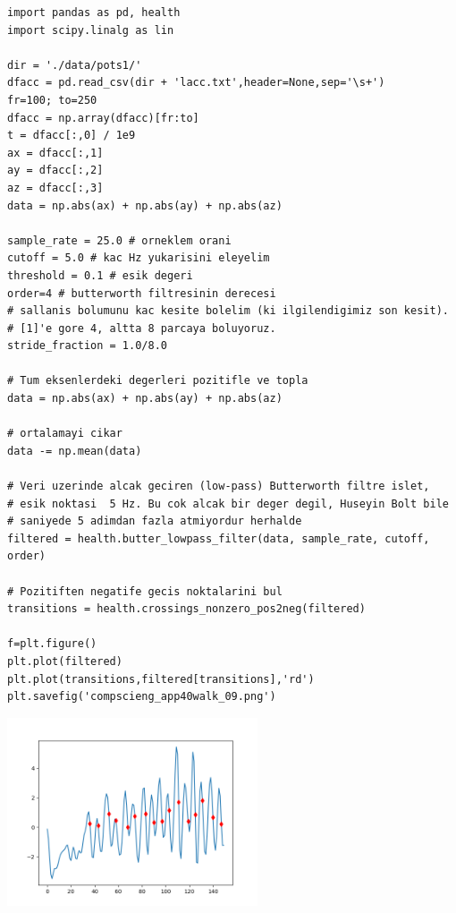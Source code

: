 \documentclass[12pt,fleqn]{article}\usepackage{../../common}
\begin{document}
\begin{verbatim}
import pandas as pd, health
import scipy.linalg as lin

dir = './data/pots1/'
dfacc = pd.read_csv(dir + 'lacc.txt',header=None,sep='\s+')
fr=100; to=250
dfacc = np.array(dfacc)[fr:to]
t = dfacc[:,0] / 1e9
ax = dfacc[:,1]
ay = dfacc[:,2]
az = dfacc[:,3]
data = np.abs(ax) + np.abs(ay) + np.abs(az)

sample_rate = 25.0 # orneklem orani
cutoff = 5.0 # kac Hz yukarisini eleyelim
threshold = 0.1 # esik degeri
order=4 # butterworth filtresinin derecesi
# sallanis bolumunu kac kesite bolelim (ki ilgilendigimiz son kesit). 
# [1]'e gore 4, altta 8 parcaya boluyoruz.
stride_fraction = 1.0/8.0 

# Tum eksenlerdeki degerleri pozitifle ve topla
data = np.abs(ax) + np.abs(ay) + np.abs(az)

# ortalamayi cikar
data -= np.mean(data)

# Veri uzerinde alcak geciren (low-pass) Butterworth filtre islet,
# esik noktasi  5 Hz. Bu cok alcak bir deger degil, Huseyin Bolt bile 
# saniyede 5 adimdan fazla atmiyordur herhalde
filtered = health.butter_lowpass_filter(data, sample_rate, cutoff, order)

# Pozitiften negatife gecis noktalarini bul
transitions = health.crossings_nonzero_pos2neg(filtered)

f=plt.figure()
plt.plot(filtered)
plt.plot(transitions,filtered[transitions],'rd')
plt.savefig('compscieng_app40walk_09.png')
\end{verbatim}

\includegraphics[width=20em]{compscieng_app40walk_09.png}
\end{document}
